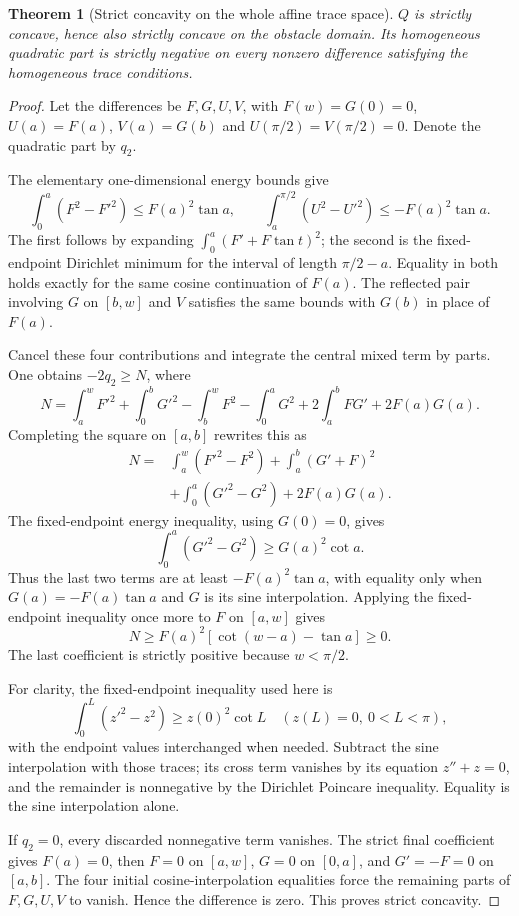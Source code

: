 \documentclass[11pt]{article}
\newtheorem{theorem}{Theorem}[section]
\begin{document}
\begin{theorem}[Strict concavity on the whole affine trace space]\label{thm:concavity}
$Q$ is strictly concave, hence also strictly concave on the obstacle domain. Its homogeneous quadratic part is strictly negative on every nonzero difference satisfying the homogeneous trace conditions.
\end{theorem}
\begin{proof}
Let the differences be $F,G,U,V$, with $F(w)=G(0)=0$, $U(a)=F(a)$, $V(a)=G(b)$ and $U(\pi/2)=V(\pi/2)=0$. Denote the quadratic part by $q_2$.

The elementary one-dimensional energy bounds give
\[
 \int_0^a(F^2-F'^2)\le F(a)^2\tan a,\qquad
 \int_a^{\pi/2}(U^2-U'^2)\le-F(a)^2\tan a.
\]
The first follows by expanding $\int_0^a(F'+F\tan t)^2$; the second is the fixed-endpoint Dirichlet minimum for the interval of length $\pi/2-a$. Equality in both holds exactly for the same cosine continuation of $F(a)$. The reflected pair involving $G$ on $[b,w]$ and $V$ satisfies the same bounds with $G(b)$ in place of $F(a)$.

Cancel these four contributions and integrate the central mixed term by parts. One obtains $-2q_2\ge N$, where
\[
 N=\int_a^wF'^2+\int_0^bG'^2-\int_b^wF^2-\int_0^aG^2
   +2\int_a^bF G'+2F(a)G(a).
\]
Completing the square on $[a,b]$ rewrites this as
\begin{align*}
 N={}&\int_a^w(F'^2-F^2)+\int_a^b(G'+F)^2\\
 &+\int_0^a(G'^2-G^2)+2F(a)G(a).
\end{align*}
The fixed-endpoint energy inequality, using $G(0)=0$, gives
\[
 \int_0^a(G'^2-G^2)\ge G(a)^2\cot a.
\]
Thus the last two terms are at least $-F(a)^2\tan a$, with equality only when $G(a)=-F(a)\tan a$ and $G$ is its sine interpolation. Applying the fixed-endpoint inequality once more to $F$ on $[a,w]$ gives
\[
 N\ge F(a)^2[\cot(w-a)-\tan a]\ge0.
\]
The last coefficient is strictly positive because $w<\pi/2$.

For clarity, the fixed-endpoint inequality used here is
\[
 \int_0^L(z'^2-z^2)\ge z(0)^2\cot L\quad(z(L)=0,\ 0<L<\pi),
\]
with the endpoint values interchanged when needed. Subtract the sine interpolation with those traces; its cross term vanishes by its equation $z''+z=0$, and the remainder is nonnegative by the Dirichlet Poincare inequality. Equality is the sine interpolation alone.

If $q_2=0$, every discarded nonnegative term vanishes. The strict final coefficient gives $F(a)=0$, then $F=0$ on $[a,w]$, $G=0$ on $[0,a]$, and $G'=-F=0$ on $[a,b]$. The four initial cosine-interpolation equalities force the remaining parts of $F,G,U,V$ to vanish. Hence the difference is zero. This proves strict concavity.
\end{proof}
\end{document}
